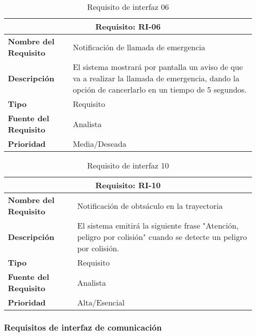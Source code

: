 \begin{table}[H]
\begin{center}
\begin{tabular}{p{} p{7cm}}
\multicolumn{2}{c}{\textbf{Requisito: RI-06} } \\
\hline \hline
\textbf{Nombre del Requisito} & Notificación de llamada de emergencia\\
\hline
\textbf{Descripción} & El sistema mostrará por pantalla un aviso de que va a realizar la llamada de emergencia, dando la opción de cancerlarlo en un tiempo de 5 segundos. \\
\hline
\textbf{Tipo} & Requisito  \\
\hline
\textbf{Fuente del Requisito} & Analista \\
\hline
\textbf{Prioridad} & Media/Deseada  \\ \hline
\end{tabular}
\caption{Requisito de interfaz 06}
\label{tab:RI-06}
\end{center}
\end{table}

\begin{table}[H]
\begin{center}
\begin{tabular}{p{} p{7cm}}
\multicolumn{2}{c}{\textbf{Requisito: RI-10} } \\
\hline \hline
\textbf{Nombre del Requisito} & Notificación de obtsáculo en la trayectoria\\
\hline
\textbf{Descripción} & El sistema emitirá la siguiente frase "Atención, peligro por colisión" cuando se detecte un peligro por colisión. \\
\hline
\textbf{Tipo} & Requisito  \\
\hline
\textbf{Fuente del Requisito} & Analista  \\
\hline
\textbf{Prioridad} & Alta/Esencial \\ \hline
\end{tabular}
\caption{Requisito de interfaz 10}
\label{tab:RI-10}
\end{center}
\end{table}

\subsubsection{Requisitos de interfaz de comunicación}

